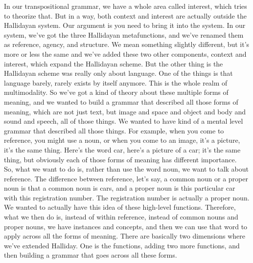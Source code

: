 \documentclass[english]{textolivre}
\begin{document}
{    In our transpositional grammar, we have a whole area called interest, which tries to theorize that. But in a way, both context and interest are actually outside the Hallidayan system. Our argument is you need to bring it into the system. In our system, we’ve got the three Hallidayan metafunctions, and we’ve renamed them as reference, agency, and structure. We mean something slightly different, but it’s more or less the same and we’ve added these two other components, context and interest, which expand the Hallidayan scheme. But the other thing is the Hallidayan scheme was really only about language. One of the things is that language barely, rarely exists by itself anymore. This is the whole realm of multimodality. So we’ve got a kind of theory about these multiple forms of meaning, and we wanted to build a grammar that described all those forms of meaning, which are not just text, but image and space and object and body and sound and speech, all of those things. We wanted to have kind of a mental level grammar that described all those things. For example, when you come to reference, you might use a noun, or when you come to an image, it’s a picture, it’s the same thing. Here’s the word car, here’s a picture of a car; it’s the same thing, but obviously each of those forms of meaning has different importance.\\
    So, what we want to do is, rather than use the word noun, we want to talk about reference. The difference between reference, let’s say, a common noun or a proper noun is that a common noun is cars, and a proper noun is this particular car with this registration number. The registration number is actually a proper noun. We wanted to actually have this idea of these high-level functions. Therefore, what we then do is, instead of within reference, instead of common nouns and proper nouns, we have instances and concepts, and then we can use that word to apply across all the forms of meaning. There are basically two dimensions where we’ve extended Halliday. One is the functions, adding two more functions, and then building a grammar that goes across all these forms.\\
}
\end{document}
